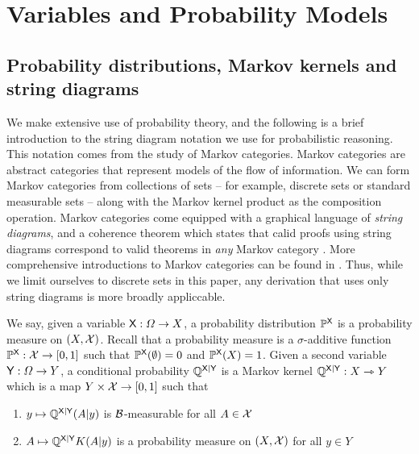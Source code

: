 

\section{Variables and Probability Models}\label{sec:vague_variables}

\subsection{Probability distributions, Markov kernels and string diagrams}

We make extensive use of probability theory, and the following is a brief introduction to the string diagram notation we use for probabilistic reasoning. This notation comes from the study of Markov categories. Markov categories are abstract categories that represent models of the flow of information. We can form Markov categories from collections of sets -- for example, discrete sets or standard measurable sets -- along with the Markov kernel product as the composition operation. Markov categories come equipped with a graphical language of \emph{string diagrams}, and a coherence theorem which states that calid proofs using string diagrams correspond to valid theorems in \emph{any} Markov category \citep{selinger_survey_2010}. More comprehensive introductions to Markov categories can be found in \citet{fritz_synthetic_2020,cho_disintegration_2019}. Thus, while we limit ourselves to discrete sets in this paper, any derivation that uses only string diagrams is more broadly appliccable.

We say, given a variable $\mathsf{X}:\Omega\to X$, a probability distribution $\mathbb{P}^{\mathsf{X}}$ is a probability measure on $(X,\mathcal{X})$. Recall that a probability measure is a $\sigma$-additive function $\mathbb{P}^{\mathsf{X}}:\mathcal{X}\to [0,1]$ such that $\mathbb{P}^{\mathsf{X}}(\emptyset)=0$ and $\mathbb{P}^{\mathsf{X}}(X)=1$. Given a second variable $\mathsf{Y}:\Omega\to Y$, a conditional probability $\mathbb{Q}^{\mathsf{X}|\mathsf{Y}}$ is a Markov kernel $\mathbb{Q}^{\mathsf{X}|\mathsf{Y}}:X\rightarrowtriangle Y$which is a map $Y\times \mathcal{X}\to [0,1]$ such that

\begin{enumerate}
	\item $y\mapsto \mathbb{Q}^{\mathsf{X}|\mathsf{Y}}(A|y)$ is $\mathcal{B}$-measurable for all $A\in \mathcal{X}$
	\item $A\mapsto \mathbb{Q}^{\mathsf{X}|\mathsf{Y}}{K}(A|y)$ is a probability measure on $(X,\mathcal{X})$ for all $y\in Y$
\end{enumerate}

